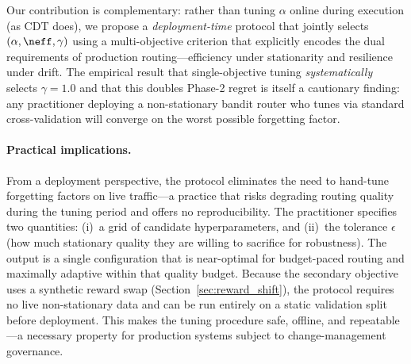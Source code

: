 Our contribution is complementary: rather than tuning $\alpha$
online during execution (as CDT does), we propose a
\emph{deployment-time} protocol that jointly selects
$(\alpha, \neff, \gamma)$ using a multi-objective criterion
that explicitly encodes the dual requirements of
production routing---efficiency under stationarity and resilience
under drift.
The empirical result that single-objective tuning
\emph{systematically} selects $\gamma{=}1.0$ and that this doubles
Phase-2 regret is itself a cautionary finding: any practitioner
deploying a non-stationary bandit router who tunes via standard
cross-validation will converge on the worst possible forgetting
factor.

\paragraph{Practical implications.}
From a deployment perspective, the protocol eliminates the need to
hand-tune forgetting factors on live traffic---a practice that risks
degrading routing quality during the tuning period and offers no
reproducibility.
The practitioner specifies two quantities: (i)~a grid of candidate
hyperparameters, and (ii)~the tolerance $\epsilon$ (how much
stationary quality they are willing to sacrifice for robustness).
The output is a single configuration that is
near-optimal for budget-paced routing and maximally adaptive within
that quality budget.
Because the secondary objective uses a synthetic reward swap
(Section~\ref{sec:reward_shift}), the protocol requires no live
non-stationary data and can be run entirely on a static validation
split before deployment.
This makes the tuning procedure safe, offline, and repeatable---a
necessary property for production systems subject to change-management
governance.
